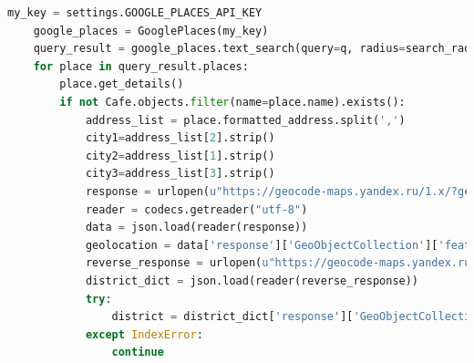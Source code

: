 \begin{ListingEnv}[H]%
	\begin{lstlisting}[language=Python]
	my_key = settings.GOOGLE_PLACES_API_KEY
	google_places = GooglePlaces(my_key)
	query_result = google_places.text_search(query=q, radius=search_radius, language=lang.RUSSIAN, types=[types.TYPE_FOOD, types.TYPE_CAFE, types.TYPE_RESTAURANT])
	for place in query_result.places:
	    place.get_details()
	    if not Cafe.objects.filter(name=place.name).exists():
	        address_list = place.formatted_address.split(',')
	        city1=address_list[2].strip()
	        city2=address_list[1].strip()
	        city3=address_list[3].strip()
	        response = urlopen(u"https://geocode-maps.yandex.ru/1.x/?geocode=" + transliterate(place.formatted_address) + u'&format=json')
	        reader = codecs.getreader("utf-8")
	        data = json.load(reader(response))
	        geolocation = data['response']['GeoObjectCollection']['featureMember'][0]['GeoObject']['Point']['pos']
	        reverse_response = urlopen(u"https://geocode-maps.yandex.ru/1.x/?geocode="+ geolocation + u'&format=json&kind=district')
	        district_dict = json.load(reader(reverse_response))
	        try:
	            district = district_dict['response']['GeoObjectCollection']['featureMember'][0]['GeoObject']['name'] 
	        except IndexError:
	            continue
	\end{lstlisting}
	\caption{Часть кода функции для получения параметра ''Адрес''  объекта с помощью обратного геотаргетинга}
	\label{list:hwbeauty}
\end{ListingEnv}




\begin{ListingEnv}[H]%
	\begin{lstlisting}[language=Python]

\end{lstlisting}
\label{list:hwbeauty}
\end{ListingEnv}

